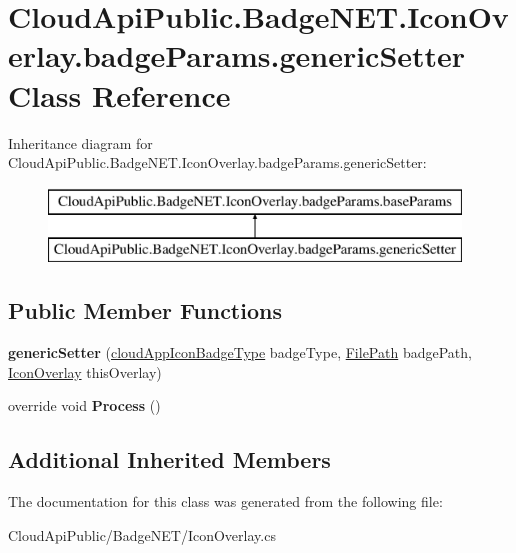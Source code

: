 \hypertarget{class_cloud_api_public_1_1_badge_n_e_t_1_1_icon_overlay_1_1badge_params_1_1generic_setter}{\section{Cloud\-Api\-Public.\-Badge\-N\-E\-T.\-Icon\-Overlay.\-badge\-Params.\-generic\-Setter Class Reference}
\label{class_cloud_api_public_1_1_badge_n_e_t_1_1_icon_overlay_1_1badge_params_1_1generic_setter}
}
Inheritance diagram for Cloud\-Api\-Public.\-Badge\-N\-E\-T.\-Icon\-Overlay.\-badge\-Params.\-generic\-Setter\-:\begin{figure}[H]
\begin{center}
\leavevmode
\includegraphics[height=2.000000cm]{class_cloud_api_public_1_1_badge_n_e_t_1_1_icon_overlay_1_1badge_params_1_1generic_setter}
\end{center}
\end{figure}
\subsection*{Public Member Functions}
\begin{DoxyCompactItemize}
\item 
\hypertarget{class_cloud_api_public_1_1_badge_n_e_t_1_1_icon_overlay_1_1badge_params_1_1generic_setter_a358847062f58dd892194869e0f9d8f56}{{\bfseries generic\-Setter} (\hyperlink{namespace_cloud_api_public_1_1_badge_n_e_t_afab91a750338fef6bd4ef08f5381c4e4}{cloud\-App\-Icon\-Badge\-Type} badge\-Type, \hyperlink{class_cloud_api_public_1_1_model_1_1_file_path}{File\-Path} badge\-Path, \hyperlink{class_cloud_api_public_1_1_badge_n_e_t_1_1_icon_overlay}{Icon\-Overlay} this\-Overlay)}\label{class_cloud_api_public_1_1_badge_n_e_t_1_1_icon_overlay_1_1badge_params_1_1generic_setter_a358847062f58dd892194869e0f9d8f56}

\item 
\hypertarget{class_cloud_api_public_1_1_badge_n_e_t_1_1_icon_overlay_1_1badge_params_1_1generic_setter_a119f96b8cfc81af0fb79d76b11447276}{override void {\bfseries Process} ()}\label{class_cloud_api_public_1_1_badge_n_e_t_1_1_icon_overlay_1_1badge_params_1_1generic_setter_a119f96b8cfc81af0fb79d76b11447276}

\end{DoxyCompactItemize}
\subsection*{Additional Inherited Members}


The documentation for this class was generated from the following file\-:\begin{DoxyCompactItemize}
\item 
Cloud\-Api\-Public/\-Badge\-N\-E\-T/Icon\-Overlay.\-cs\end{DoxyCompactItemize}
